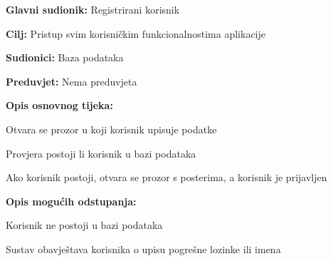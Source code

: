 					\noindent {}
					\begin{packed_item}
						
						\item \textbf{Glavni sudionik: } Registrirani korisnik
						\item  \textbf{Cilj:} Pristup svim korisničkim funkcionalnostima aplikacije
						\item  \textbf{Sudionici:} Baza podataka
						\item  \textbf{Preduvjet:} Nema preduvjeta
						\item  \textbf{Opis osnovnog tijeka:}
						
						\item[] \begin{packed_enum}
							
							\item Otvara se prozor u koji korisnik upisuje podatke
							\item Provjera postoji li korisnik u bazi podataka
							\item Ako korisnik postoji, otvara se prozor s posterima, a korisnik je prijavljen
						\end{packed_enum}
						
						\item  \textbf{Opis mogućih odstupanja:}
						
						\item[] \begin{packed_item}
							
							\item[3.a] Korisnik ne postoji u bazi podataka
							\item[] \begin{packed_enum}
								
								\item Sustav obavještava korisnika o upisu pogrešne lozinke ili imena
								
							\end{packed_enum}
							
						\end{packed_item}
					\end{packed_item}
					
